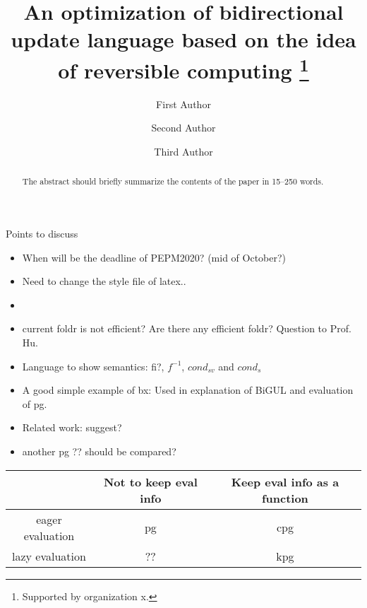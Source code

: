 \documentclass[runningheads]{llncs}
\begin{document}
%
\title{An optimization of bidirectional update language based on the idea of reversible computing
 \thanks{Supported by organization x.}}
%
%
\author{First Author \and
Second Author \and
Third Author}
%
%
%
\maketitle              %
%
\begin{abstract}
The abstract should briefly summarize the contents of the paper in
15--250 words.

\end{abstract}
%
%
%

Points to discuss
\begin{itemize}
\item When will be the deadline of PEPM2020? (mid of October?)
\item Need to change the style file of latex..
\item []

\item current foldr is not efficient? Are there any efficient foldr? Question to Prof. Hu.
\item Language to show semantics: fi?, $f^{-1}$, $cond_{sv}$ and $cond_{s}$
\item A good simple example of bx: Used in explanation of BiGUL and evaluation of pg.
\item Related work: suggest?
\item another pg ?? should be compared?
\end{itemize}


\begin{tabular}{c|c|c}
  {} & {Not to keep eval info} & {Keep eval info as a function}\\ \hline
  {eager evaluation} & {pg} & {cpg}\\ \hline
  {lazy evaluation} & {??} & {kpg}
\end{tabular}
\end{document}
